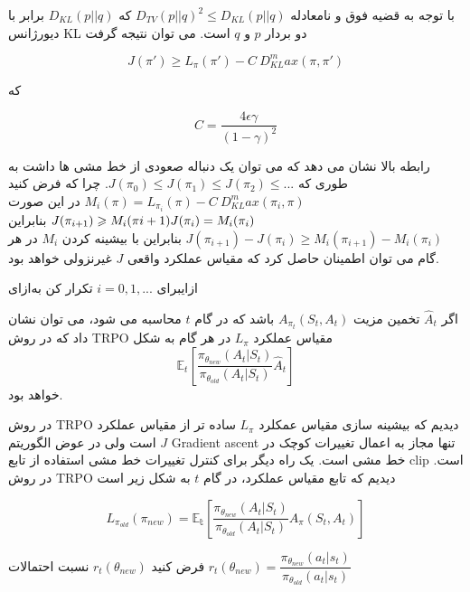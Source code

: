 با توجه به قضیه فوق و نامعادله 
$D_{TV}(p || q)^2 \le D_{KL}(p || q)$
\cite{schulman2015trust}
که 
$D_{KL} (p || q)$
برابر با دیورژانس KL دو بردار $p$ و $q$ است. می توان  نتیجه گرفت

$$J(\pi') \ge L_{\pi}(\pi') - C \ D_{KL}^max(\pi, \pi')$$

که

$$C = \dfrac{4 \epsilon \gamma}{(1-\gamma)^2}$$

رابطه بالا نشان می دهد که می توان یک دنباله صعودی از خط مشی ها داشت به طوری که
$J(\pi_0) \le J(\pi_1) \le J(\pi_2) \le ...$.
چرا که فرض کنید 
$M_i(\pi) = L_{\pi_i}(\pi) - C \ D_{KL}^max(\pi_i, \pi)$
در این صورت
$J(\pi_{i+1}) \ge M_i(\pi{i+1}) \\
J(\pi_i) = M_i(\pi_i)
$
بنابراین
$J(\pi_{i+1}) - J(\pi_i) \ge M_i(\pi_{i+1}) - M_i(\pi_i)$
بنابراین با بیشینه کردن $M_i$ در هر گام می توان اطمینان حاصل کرد که مقیاس عملکرد واقعی $J$ غیرنزولی خواهد بود.


‌ازای{برای 
	$i=0,1,...$
	 تکرار کن}
‌به‌ازای

اگر $\hat{A}_t$ تخمین مزیت 
$A_{\pi_t}(S_t, A_t)$
باشد که در گام $t$ محاسبه می شود، می توان نشان داد که در روش TRPO مقیاس عملکرد $L_\pi$ در هر گام به شکل
$$\mathbb{E}_t\left[\dfrac{\pi_{\theta_{new}}(A_t| S_t)}{\pi_{\theta_{old}}(A_t|S_t)} \hat{A}_t \right]$$
خواهد بود.

در روش TRPO دیدیم که بیشینه سازی مقیاس عمکلرد $L_\pi$ ساده تر از مقیاس عملکرد $J$ است ولی در عوض الگوریتم Gradient ascent تنها مجاز به اعمال تغییرات کوچک در خط مشی است. یک راه دیگر برای کنترل تغییرات خط مشی استفاده از تابع clip است. در روش TRPO دیدیم که  تابع مقیاس عملکرد، در گام $t$ به شکل زیر است

$$L_{\pi_{old}}(\pi_{new}) = \mathbb{E_t}\left[\dfrac{\pi_{\theta_{new}}(A_t| S_t)}{\pi_{\theta_{old}}(A_t|S_t)} A_{\pi}(S_t, A_t)\right]$$

فرض کنید 
$r_t(\theta_{new})$
 نسبت احتمالات 
$r_t(\theta_{new}) = \dfrac{\pi_{\theta_{new}}(a_t|s_t)}{\pi_{\theta_{old}}(a_t|s_t)}$


